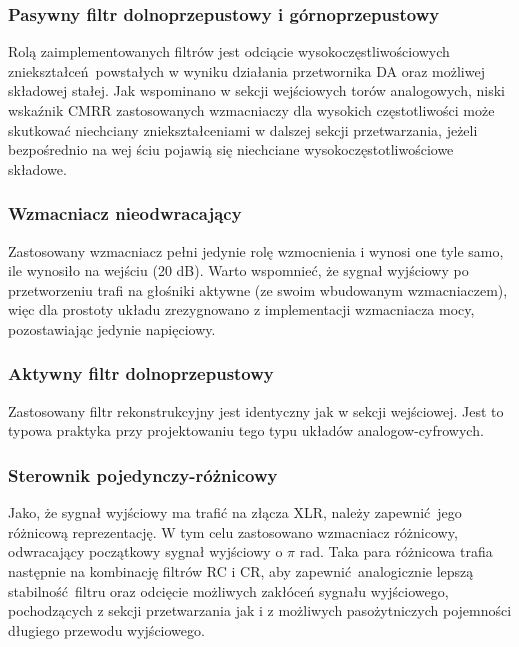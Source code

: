 \documentclass{scrartcl}
\begin{document}
\subsubsection{Pasywny filtr dolnoprzepustowy i górnoprzepustowy}
Rolą zaimplementowanych filtrów jest odciącie wysokoczęstliwościowych zniekształceń powstałych w wyniku działania przetwornika DA oraz możliwej składowej stałej. Jak wspominano w sekcji wejściowych torów analogowych, niski wskaźnik CMRR zastosowanych wzmacniaczy dla wysokich częstotliwości może skutkować niechciany zniekształceniami w dalszej sekcji przetwarzania, jeżeli bezpośrednio na wej ściu pojawią się niechciane wysokoczęstotliwościowe składowe.
\subsubsection{Wzmacniacz nieodwracający}
Zastosowany wzmacniacz pełni jedynie rolę wzmocnienia i wynosi one tyle samo, ile wynosiło na wejściu (20 dB). Warto wspomnieć, że sygnał wyjściowy po przetworzeniu trafi na głośniki aktywne (ze swoim wbudowanym wzmacniaczem), więc dla prostoty układu zrezygnowano z implementacji wzmacniacza mocy, pozostawiając jedynie napięciowy.
\subsubsection{Aktywny filtr dolnoprzepustowy}
Zastosowany filtr rekonstrukcyjny jest identyczny jak w sekcji wejściowej. Jest to typowa praktyka przy projektowaniu tego typu układów analogow-cyfrowych.
\subsubsection{Sterownik pojedynczy-różnicowy}
Jako, że sygnał wyjściowy ma trafić na złącza XLR, należy zapewnić jego różnicową reprezentację. W tym celu zastosowano wzmacniacz różnicowy, odwracający początkowy sygnał wyjściowy o $\pi$ rad. Taka para różnicowa trafia następnie na kombinację filtrów RC i CR, aby zapewnić analogicznie lepszą stabilność filtru oraz odcięcie możliwych zakłóceń sygnału wyjściowego, pochodzących z sekcji przetwarzania jak i z możliwych pasożytniczych pojemności długiego przewodu wyjściowego.
\newpage
\end{document}

